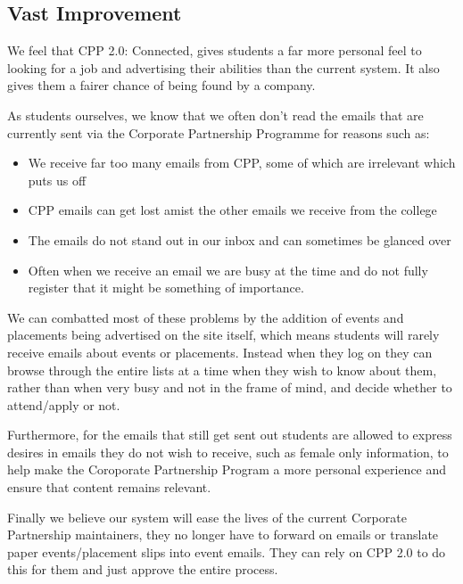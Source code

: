 \subsection{Vast Improvement}
We feel that CPP 2.0: Connected, gives students a far more personal feel to looking for a job and advertising their abilities than the current system. It also gives them a fairer chance of being found by a company.

As students ourselves, we know that we often don't read the emails that are currently sent via the Corporate Partnership Programme for reasons such as:
\begin{itemize}
  \item We receive far too many emails from CPP, some of which are irrelevant which puts us off
  \item CPP emails can get lost amist the other emails we receive from the college
  \item The emails do not stand out in our inbox and can sometimes be glanced over
  \item Often when we receive an email we are busy at the time and do not fully register that it might be something of importance.
\end{itemize} 

We can combatted most of these problems by the addition of events and placements being advertised on the site itself, which means students will rarely receive emails about events or placements. Instead when they log on they can browse through the entire lists at a time when they wish to know about them, rather than when very busy and not in the frame of mind, and decide whether to attend/apply or not.

Furthermore, for the emails that still get sent out students are allowed to express desires in emails they do not wish to receive, such as female only information, to help make the Coroporate Partnership Program a more personal experience and ensure that content remains relevant. 

Finally we believe our system will ease the lives of the current Corporate Partnership maintainers, they no longer have to forward on emails or translate paper events/placement slips into event emails. They can rely on CPP 2.0 to do this for them and just approve the entire process.